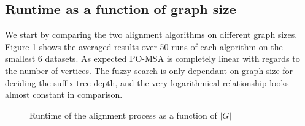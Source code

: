 \documentclass[thesis.tex]{subfiles}
\begin{document}
\subsection*{Runtime as a function of graph size}
We start by comparing the two alignment algorithms on different graph sizes. Figure \ref{fig:runtime_G} shows the averaged results over 50 runs of each algorithm on the smallest 6 datasets. As expected PO-MSA is completely linear with regards to the number of vertices. The fuzzy search is only dependant on graph size for deciding the suffix tree depth, and the very logarithmical relationship looks almost constant in comparison.
\clearpage
\begin{figure}[!ht]
  \caption{Runtime of the alignment process as a function of $|G|$}
  \label{fig:runtime_G}
\end{figure}
\end{document}
